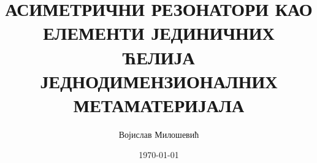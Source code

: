 \documentclass[12pt,oneside]{book}
\title{АСИМЕТРИЧНИ РЕЗОНАТОРИ КАО ЕЛЕМЕНТИ ЈЕДИНИЧНИХ ЋЕЛИЈА ЈЕДНОДИМЕНЗИОНАЛНИХ МЕТАМАТЕРИЈАЛА}
\date{\today}
\author{Војислав Милошевић}
\def\biblio{}  %
\begin{document}
\def\biblio{}

\maketitle

\tableofcontents













\end{document}
